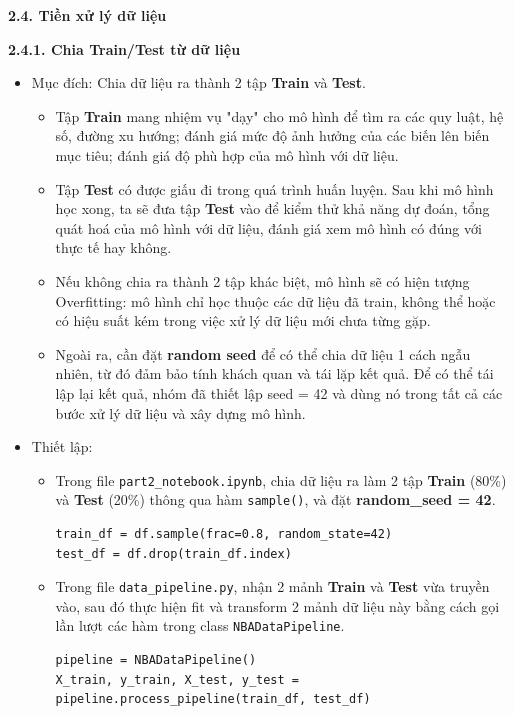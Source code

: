 \textbf{2.4. Tiền xử lý dữ liệu}

\textbf{2.4.1. Chia Train/Test từ dữ liệu}
\begin{itemize}
    \item Mục đích: Chia dữ liệu ra thành 2 tập \textbf{Train} và \textbf{Test}. 
    \begin{itemize}
        \item Tập \textbf{Train} mang nhiệm vụ "dạy" cho mô hình để tìm ra các quy luật, hệ số, đường xu hướng; đánh giá mức độ ảnh hưởng của các biến lên biến mục tiêu; đánh giá độ phù hợp của mô hình với dữ liệu. 
        \item Tập \textbf{Test} có được giấu đi trong quá trình huấn luyện. Sau khi mô hình học xong, ta sẽ đưa tập \textbf{Test} vào để kiểm thử khả năng dự đoán, tổng quát hoá của mô hình với dữ liệu, đánh giá xem mô hình có đúng với thực tế hay không.
        \item Nếu không chia ra thành 2 tập khác biệt, mô hình sẽ có hiện tượng Overfitting: mô hình chỉ học thuộc các dữ liệu đã train, không thể hoặc có hiệu suất kém trong việc xử lý dữ liệu mới chưa từng gặp.
        \item Ngoài ra, cần đặt \textbf{random seed} để có thể chia dữ liệu 1 cách ngẫu nhiên, từ đó đảm bảo tính khách quan và tái lặp kết quả. Để có thể tái lập lại kết quả, nhóm đã thiết lập seed = 42 và dùng nó trong tất cả các bước xử lý dữ liệu và xây dựng mô hình.
    \end{itemize}
    \item Thiết lập:
    \begin{itemize}
        \item Trong file \texttt{part2\_notebook.ipynb}, chia dữ liệu ra làm 2 tập \textbf{Train} (80\%) và \textbf{Test} (20\%) thông qua hàm \texttt{sample()}, và đặt \textbf{random\_seed = 42}.
\begin{verbatim}
train_df = df.sample(frac=0.8, random_state=42)
test_df = df.drop(train_df.index)
\end{verbatim}
        \item Trong file \texttt{data\_pipeline.py}, nhận 2 mảnh \textbf{Train} và \textbf{Test} vừa truyền vào, sau đó thực hiện fit và transform 2 mảnh dữ liệu này bằng cách gọi lần lượt các hàm trong class \texttt{NBADataPipeline}.
\begin{verbatim}
pipeline = NBADataPipeline()
X_train, y_train, X_test, y_test = pipeline.process_pipeline(train_df, test_df)
\end{verbatim}
    \end{itemize}
\end{itemize}

